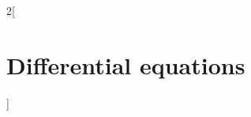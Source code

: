 \documentclass[../../../main.tex]{subfiles}
\begin{document}
\begin{multicols}{2}[\section{Differential equations}]

\end{multicols}
\end{document}
